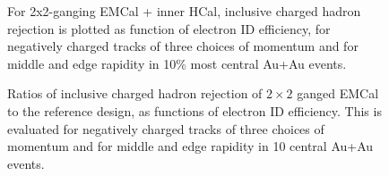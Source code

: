 \begin{figure}[hbt]
  \centering
  \caption{For 2x2-ganging EMCal + inner HCal, inclusive charged
    hadron rejection is plotted as function of electron ID efficiency,
    for negatively charged tracks of three choices of momentum and for
    middle and edge rapidity in 10\% most central Au+Au events.}
  \label{fig:eid_auau}
\end{figure}

\begin{figure}[hbt]
  \centering

  \caption{ Ratios of inclusive charged hadron rejection of $2\times2$ ganged
 EMCal to the reference design, as functions of electron ID
 efficiency. This is evaluated for negatively charged tracks of three
 choices of momentum and for middle and edge rapidity in 10%
 central Au+Au events.}
\label{fig:eid_ratios_auau}
\end{figure}
